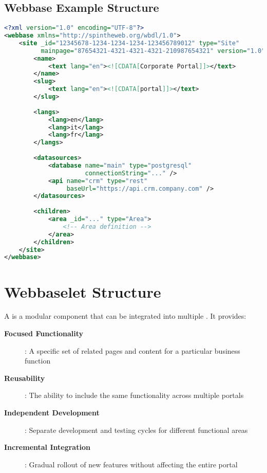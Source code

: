 \subsection{Webbase Example Structure}

\begin{lstlisting}[language=XML,caption={Basic Webbase Structure}]
<?xml version="1.0" encoding="UTF-8"?>
<webbase xmlns="http://spintheweb.org/wbdl/1.0">
    <site _id="12345678-1234-1234-1234-123456789012" type="Site" 
          mainpage="87654321-4321-4321-4321-210987654321" version="1.0">
        <name>
            <text lang="en"><![CDATA[Corporate Portal]]></text>
        </name>
        <slug>
            <text lang="en"><![CDATA[portal]]></text>
        </slug>
        
        <langs>
            <lang>en</lang>
            <lang>it</lang>
            <lang>fr</lang>
        </langs>
        
        <datasources>
            <database name="main" type="postgresql" 
                      connectionString="..." />
            <api name="crm" type="rest" 
                 baseUrl="https://api.crm.company.com" />
        </datasources>
        
        <children>
            <area _id="..." type="Area">
                <!-- Area definition -->
            </area>
        </children>
    </site>
</webbase>
\end{lstlisting}

\section{Webbaselet Structure}
\label{sec:webbaselet-structure}

A \webbaselet{} is a modular component that can be integrated into multiple . It provides:

\begin{description}
\item[\textbf{Focused Functionality}]: A specific set of related pages and content for a particular business function
\item[\textbf{Reusability}]: The ability to include the same functionality across multiple portals
\item[\textbf{Independent Development}]: Separate development and testing cycles for different functional areas
\item[\textbf{Incremental Integration}]: Gradual rollout of new features without affecting the entire portal
\end{description}

